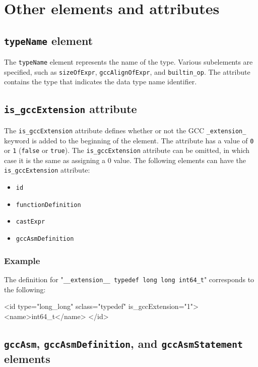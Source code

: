 \section{Other elements and attributes}


\subsection{ {\tt typeName} element}

The {\tt typeName} element represents the name of the type. Various subelements are specified, such as {\tt sizeOfExpr}, {\tt gccAlignOfExpr}, and {\tt builtin\_op}. The attribute contains the type that indicates the data type name identifier.


\subsection{ {\tt is\_gccExtension} attribute}

The {\tt is\_gccExtension} attribute defines whether or not the GCC {\tt \_extension\_} keyword is added to the beginning of the element. The attribute has a value of {\tt 0} or {\tt 1} ({\tt false} or {\tt true}). The {\tt is\_gccExtension} attribute can be omitted, in which case it is the same as assigning a 0 value. The following elements can have the {\tt is\_gccExtension} attribute:

\begin{itemize}
\item {\tt id}
\item {\tt functionDefinition}
\item {\tt castExpr}
\item {\tt gccAsmDefinition}
\end{itemize}

\subsubsection*{Example}

The definition for "{\tt \_\_extension\_\_ typedef long long int64\_t}" corresponds to the following:
\vspace{2mm}

\begin{XcodeMLExample}
 <id type="long_long" sclass="typedef" is_gccExtension="1">
   <name>int64_t</name>
 </id>
\end{XcodeMLExample}


\subsection{ {\tt gccAsm}, {\tt gccAsmDefinition}, and {\tt gccAsmStatement} elements}

